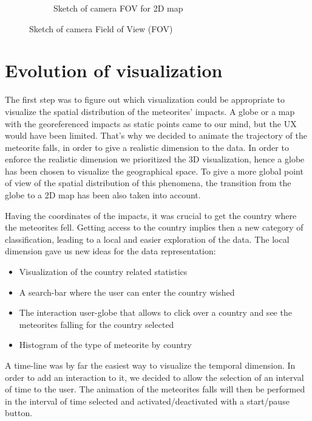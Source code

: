 \documentclass[10pt,conference,compsocconf]{IEEEtran}
\begin{document}
\begin{figure}
\begin{subfigure}{.45\textwidth}
  \caption{Sketch of camera FOV for 2D map}
  \label{fig:timeline_final_without_label}
\end{subfigure}
\caption{Sketch of camera Field of View (FOV)}
\label{fig:sketch_FOV}
\end{figure}

\newpage
\section{Evolution of visualization}
\label{sec:evolution_of_visualization}


The first step was to figure out which visualization could be appropriate to visualize the spatial distribution of the meteorites' impacts. A globe or a map with the georeferenced impacts as static points came to our mind, but the UX would have been limited. That's why we decided to animate the trajectory of the meteorite falls, in order to give a realistic dimension to the data. In order to enforce the realistic dimension we prioritized the 3D visualization, hence a globe has been chosen to visualize the geographical space. To give a more global point of view of the spatial distribution of this phenomena, the transition from the globe to a 2D map has been also taken into account. 

Having the coordinates of the impacts, it was crucial to get the country where the meteorites fell. Getting access to the country implies then a new category of classification, leading to a local and easier exploration of the data. The local dimension gave us new ideas for the data representation: 

\begin{itemize}
\item Visualization of the country related statistics
\item A search-bar where the user can enter the country wished
\item The interaction user-globe that allows to click over a country and see the meteorites falling for the country selected 
\item Histogram of the type of meteorite by country
\end{itemize}

A time-line was by far the easiest way to visualize the temporal dimension. In order to add an interaction to it, we decided to allow the selection of an interval of time to the user. The animation of the meteorites falls will then be performed in the interval of time selected and activated/deactivated with a start/pause button.
\end{document}
